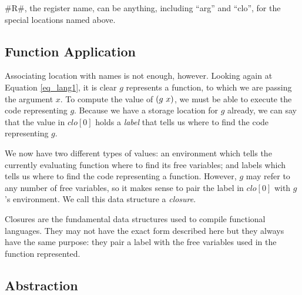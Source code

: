 \documentclass[12pt]{report}
\begin{document}
#R#, the register name, can be anything, including ``arg'' and ``clo'', for the special locations named above.

\subsection{Function Application}

Associating location with names is not enough, however. Looking again
at Equation \ref{eq_lang1}, it is clear $g$ represents a function, to
which we are passing the argument $x$. To compute the value of
$(g\ x)$, we must be able to execute the code representing
$g$. Because we have a storage location for $g$ already, we can
say that the value in $clo[0]$ holds a \emph{label} that tells us
where to find the code representing $g$. 

We now have two different types of values: an environment which tells
the currently evaluating function where to find its free variables;
and labels which tells us where to find the code representing a
function. However, $g$ may refer to any number of free variables, so
it makes sense to pair the label in $clo[0]$ with $g$'s environment. We call
this data structure a \emph{closure}.

Closures are the fundamental data structures used to compile functional
languages. They may not have the exact form described here but they always
have the same purpose: they pair a label with the free variables used in the
function represented. 

\subsection{Abstraction}






\end{document}
